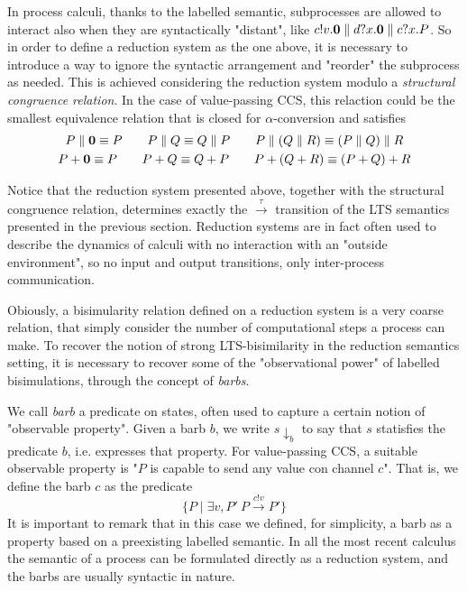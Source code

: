 In process calculi, thanks to the labelled semantic, subprocesses are allowed to interact also when they are syntactically "distant", like $c!v.\mathbf{0} \parallel d?x.\mathbf{0} \parallel c?x.P$. So in order to define a reduction system as the one above, it is necessary to introduce a way to ignore the syntactic arrangement and "reorder" the subprocess as needed.  This is achieved considering the reduction system modulo a \textit{structural congruence relation}. In the case of value-passing CCS, this relaction could be the smallest equivalence relation that is closed for $\alpha$-conversion and satisfies  
\begin{gather*}
P\parallel\mathbf{0} \equiv P \qquad P\parallel Q \equiv Q \parallel P \qquad P\parallel(Q\parallel R) \equiv (P \parallel Q) \parallel R \\
P + \mathbf{0} \equiv P \qquad P + Q \equiv Q + P \qquad P + (Q + R) \equiv (P + Q) + R
\end{gather*}

Notice that the reduction system presented above, together with the structural congruence relation, determines exactly the $\xrightarrow{\tau}$ transition of the LTS semantics presented in the previous section. Reduction systems are in fact often used to describe the dynamics of calculi with no interaction with an "outside environment", so no input and output transitions, only inter-process communication.


Obiously, a bisimularity relation defined on a reduction system is a very coarse relation, that simply consider the number of computational steps a process can make. To recover the notion of strong LTS-bisimilarity in the reduction semantics setting, it is necessary to recover some of the "observational power" of labelled bisimulations, through the concept of \textit{barbs}.

We call \textit{barb} a predicate on states, often used to capture a certain notion of "observable property". Given a barb $b$, we write $s\downarrow_b$ to say that $s$ statisfies the predicate $b$, i.e. expresses that property. For value-passing CCS, a suitable observable property is "$P$ is capable to send any value con channel $c$". That is, we define the barb $c$ as the predicate 
\[\{P \mid \exists v, P' \ P \xrightarrow{c!v} P'\}\]
It is important to remark that in this case we defined, for simplicity, a barb as a property based on a preexisting labelled semantic. In all the most recent calculus the semantic of a process can be formulated directly as a reduction system, and the barbs are usually syntactic in nature.

